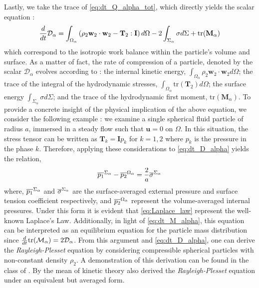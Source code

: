Lastly, we take the trace of \ref{eq:dt_Q_alpha_tot}, which directly yields the scalar equation :
\begin{equation}
    \frac{d}{d t} \mathcal{D}_\alpha
    = \int_{\Omega_\alpha} \left(
        \rho_2 \textbf{w}_2 \cdot \textbf{w}_2
        - \mathbf{T}_2 : \textbf{I}
        \right) d\Omega
        - 2\int_{\Sigma_\alpha} \sigma d\Sigma
        + \text{tr}(\textbf{M}_\alpha)
    \label{eq:dt_D_alpha}
\end{equation}
which correspond to the isotropic work balance within the particle's volume and surface. 
As a matter of fact, the rate of compression of a particle, denoted by the scalar $\mathcal{D}_\alpha$ evolves according to : 
the internal kinetic energy, $\int_{\Omega_\alpha}\rho_2 \textbf{w}_2 \cdot \textbf{w}_2 d\Omega$;
the trace of the integral of the hydrodynamic stresses, $\int_{\Omega_\alpha} \text{tr}(\textbf{T}_2)d\Omega$; 
the surface energy $\int_{\Sigma_\alpha} \sigma d\Sigma$; 
and the trace of the hydrodynamic first moment, $\text{tr}(\textbf{M}_\alpha)$.
To provide a concrete insight of the physical implication of the above equation, we consider the following example :
we examine a single spherical fluid particle of radius $a$, immersed in a steady flow such that $\textbf{u} = 0$ on $\Omega$. 
In this situation, the stress tensor can be written as $\textbf{T}_k = \textbf{I} p_k$ for $k = 1, 2$ where $p_k$ is the pressure in the phase $k$. 
Therefore, applying these considerations to \ref{eq:dt_D_alpha} yields the relation, 
\begin{equation*}
    \overline{p_1}^{\Sigma_\alpha}
    -  \overline{p_2}^{\Omega_\alpha} 
    =
    \frac{2}{a} \overline{\sigma}^{\Sigma_\alpha}
    \label{eq:Laplace_law}
\end{equation*}
where,  $\overline{p_1}^{\Sigma_\alpha}$ and  $\overline{\sigma}^{\Sigma_\alpha}$ are the surface-averaged external pressure and surface tension coefficient respectively, and $\overline{p_2}^{\Omega_\alpha}$ represent the volume-averaged internal pressures.
Under this form it is evident that \ref{eq:Laplace_law} represent the well-known Laplace's Law. 
Additionally, in light of \ref{eq:dt_M_alpha}, this equation can be interpreted as an equilibrium equation for the particle mass distribution since $\frac{d}{d t}\text{tr}(\mathcal{M}_\alpha) = 2 \mathcal{D}_\alpha$. 
From this argument and \ref{eq:dt_D_alpha}, one can derive the \textit{Rayleigh-Plesset} equation by considering compressible spherical particles with non-constant density $\rho_2$.
A demonstration of this derivation can be found in the class of . 
By the mean of kinetic theory \citet{zhang1994averaged} also derived the \textit{Rayleigh-Plesset} equation under an equivalent but averaged form.


